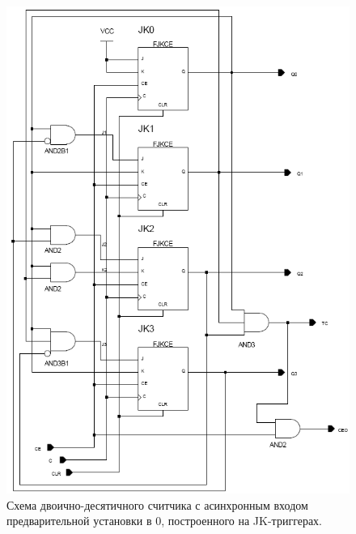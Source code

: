 \documentclass[a4paper,12pt]{article}
\begin{document}
\newpage
\begin{figure}[!htb]
	\caption{Схема двоично-десятичного считчика с асинхронным входом предварительной установки в 0, построенного на JK-триггерах.}
	\label{fig:jkcount}
	\centering
	\includegraphics[scale=0.5]{lab4jk}
\end{figure}
\end{document}
